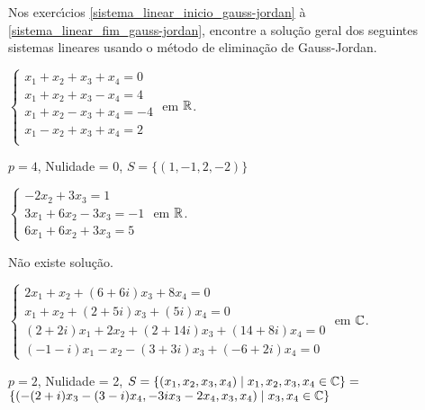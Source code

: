 \documentclass[12pt]{exam}
\begin{document}
Nos exerc{\'\i}cios \ref{sistema_linear_inicio_gauss-jordan} \`a \ref{sistema_linear_fim_gauss-jordan}, encontre a solu\c{c}\~ao geral dos seguintes sistemas lineares usando o método de eliminação de Gauss-Jordan.

\begin{exercicio}\label{sistema_linear_inicio_gauss-jordan}
  $
    \begin{cases}
      x_1 + x_2 + x_3 + x_4 = 0\\
      x_1 + x_2 + x_3 - x_4 = 4\\
      x_1 + x_2 - x_3 + x_4 = -4\\
      x_1 - x_2 + x_3 + x_4 = 2\\
    \end{cases}
  $
  em $\mathbb{R}$.
  \begin{solucao}
    $p = 4$, Nulidade = 0, $S = \{(1, -1, 2, -2)\}$
  \end{solucao}
\end{exercicio}

\begin{exercicio}
  $
    \begin{cases}
      -2x_2 + 3x_3 = 1\\
      3x_1 + 6x_2 - 3x_3 = -1\\
      6x_1 + 6x_2 + 3x_3 = 5
    \end{cases}
  $
  em $\mathbb{R}$.
  \begin{solucao}
    N\~ao existe solu\c{c}\~ao.
  \end{solucao}
\end{exercicio}

\begin{exercicio}
  $
    \begin{cases}
      2x_1 + x_2 + (6 + 6i)x_3 + 8x_4 = 0\\
      x_1 + x_2 + (2 + 5i)x_3 + (5  i)x_4 = 0\\
      (2 + 2i)x_1 + 2x_2 + (2 + 14i)x_3 + (14 + 8i)x_4 =0\\
      (-1 - i)x_1 - x_2 - (3 + 3i)x_3 + (-6 + 2i)x_4 = 0
    \end{cases}
  $
  em $\mathbb{C}$.
  \begin{solucao}
    $p = 2$, Nulidade = 2, $S = \{(x_1, x_2, x_3, x_4) \mid x_1, x_2, x_3, x_4 \in \mathbb{C}\} = $\\ $\{(-(2 + i)x_3 - (3 - i)x_4,-3ix_3 - 2x_4, x_3, x_4) \mid x_3, x_4 \in \mathbb{C}\}$
  \end{solucao}
\end{exercicio}
\end{document}
